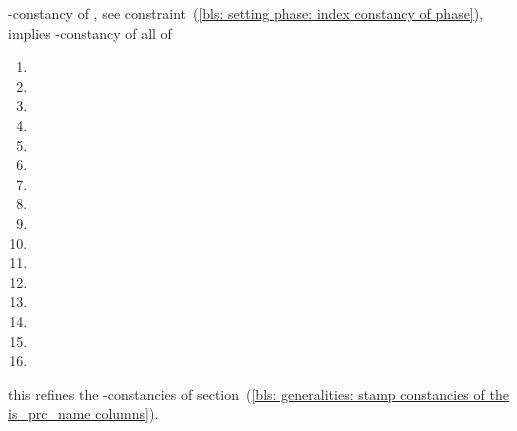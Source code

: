 \saNote{} \label{bls: setting phase: index constancy of data and result flags}
\blsIndex{}-constancy of \blsPhase{},
see constraint~(\ref{bls: setting phase: index constancy of phase}),
implies \blsIndex{}-constancy of all of
\begin{multicols}{2}
	\begin{enumerate}
		\item \isPointEvaluationData
		\item \isBlsGOneAddData
		\item \isBlsGOneMsmData
		\item \isBlsGTwoAddData
		\item \isBlsGTwoMsmData
		\item \isBlsPairingCheckData
		\item \isBlsMapFpToGOneData
		\item \isBlsMapFpTwoToGTwoData
		\item \isPointEvaluationResult
		\item \isBlsGOneAddResult
		\item \isBlsGOneMsmResult
		\item \isBlsGTwoAddResult
		\item \isBlsGTwoMsmResult
		\item \isBlsPairingCheckResult
		\item \isBlsMapFpToGOneResult
		\item \isBlsMapFpTwoToGTwoResult
	\end{enumerate}
\end{multicols}
\noindent this refines the \blsStamp{}-constancies of
section~(\ref{bls: generalities: stamp constancies of the is_prc_name columns}).
